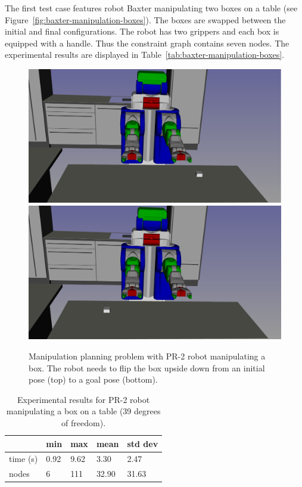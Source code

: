 The first test case features robot Baxter manipulating two boxes on a table (see Figure~\ref{fig:baxter-manipulation-boxes}). The boxes are swapped between the initial and final configurations. The robot has two grippers and each box is equipped with a handle. Thus the constraint graph contains seven nodes. The experimental results are displayed in Table~\ref{tab:baxter-manipulation-boxes}.

\begin{figure}
  \begin{center}
    \includegraphics[width=\linewidth]{figures/pr2-manipulation-two-hands-init.png}
    \includegraphics[width=\linewidth]{figures/pr2-manipulation-two-hands-goal.png}    
  \end{center}
  \caption{Manipulation planning problem with PR-2 robot manipulating a box. The robot needs to flip the box upside down from an initial pose (top) to a goal pose (bottom).}
  \label{fig:pr2-manipulation-two-hands}
\end{figure}

\begin{table}
  \begin{center}
  \begin{tabular}{|l|l|l|l|l|}
    \hline
    & min & max & mean & std dev \\
    \hline
    time (s) & 0.92 & 9.62 & 3.30 & 2.47 \\
    nodes & 6 &  111 & 32.90 & 31.63 \\
    \hline
  \end{tabular}
  \end{center}
  \caption{Experimental results for PR-2 robot manipulating a box on a table
     {\color{blue}(39 degrees of freedom)}.}
  \label{tab:pr2-manipulation-two-hands}
\end{table}


